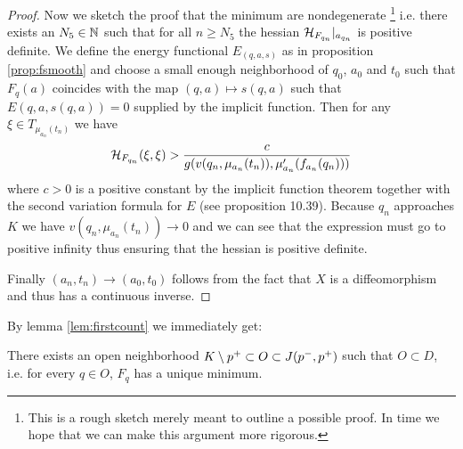 \begin{proof}
    Now we sketch the proof that the minimum are nondegenerate 
    \footnote{This is a rough sketch merely meant to outline a possible proof. In time we hope that we can make this argument more rigorous.}
    i.e. there exists an $N_5\in \mathbb{N}$ such that for all $n\ge N_5$ the hessian ${\mathcal{H}}_{F_{q_n}}\rvert_{a_{q_n}}$ is positive definite. We define the energy functional $E_(q,a,s)$ as in proposition \ref{prop:fsmooth} and choose a small enough neighborhood of $q_0$, $a_0$ and $t_0$ such that $F_q(a)$ coincides with the map $(q,a)\mapsto s(q,a)$ such that $E(q,a,s(q,a))=0$ supplied by the implicit function. Then for any $\xi\in T_{\mu_{a_n}(t_n)}$ we have 
    \begin{align*}
        {\mathcal{H}}_{F_{q_n}}(\xi,\xi) > \frac{c}{g(v(q_n,\mu_{a_n}(t_n)),\mu_{a_n}'(f_{a_n}(q_n)))}
    \end{align*}
    where $c>0$ is a positive constant by the implicit function theorem together with the second variation formula for $E$ (see \cite{oneill} proposition 10.39). Because $q_n$ approaches $K$ we have $v(q_n,\mu_{a_n}(t_n))\to 0$ and we can see that the expression must go to positive infinity thus ensuring that the hessian is positive definite. 

    Finally $(a_n,t_n)\to (a_0,t_0)$ follows from the fact that $X$ is a diffeomorphism and thus has a continuous inverse.
\end{proof}

By lemma \ref{lem:firstcount} we immediately get:
\begin{corollary}
    There exists an open neighborhood $K\setminus p^+\subset O\subset J(p^-,p^+)$ such that $O\subset D$, i.e. for every $q\in O$, $F_q$ has a unique minimum.
\end{corollary}

